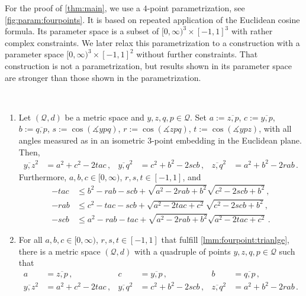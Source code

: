 \documentclass{article}
\newcommand*{\mc}[1]{\mathcal{#1}}
\newcommand{\Rp}{[0, \infty)} %
\newcommand{\equationFullstop}{\, .}
\newcommand{\eqfs}{\equationFullstop}
\newcommand{\equationComma}{\, ,}
\newcommand{\eqcm}{\equationComma}
\newcommand{\ol}[2]{\overline{#1,#2}}
\begin{document}
%
For the proof of \cref{thm:main}, we use a $4$-point parametrization, see \cref{fig:param:fourpoints}. It is based on repeated application of the Euclidean cosine formula. Its parameter space is a subset of $\Rp^3\times[-1,1]^3$ with rather complex constraints. We later relax this parametrization to a construction with a parameter space $\Rp^3\times[-1,1]^2$ without further constraints. That construction is not a parametrization, but results shown in its parameter space are stronger than those shown in the parametrization.
%
\begin{proposition}\label{lmm:fourpoint}\mbox{ }
	\begin{enumerate}[label=(\roman*)]
		\item Let $(\mc Q, d)$ be a metric space and $y,z,q,p\in\mc Q$. Set $a:=\ol zp$, $c:=\ol yp$, $b:=\ol qp$, $s := \cos(\measuredangle ypq)$, $r := \cos(\measuredangle zpq)$, $t := \cos(\measuredangle ypz)$, with all angles measured as in an isometric $3$-point embedding in the Euclidean plane.
		Then,
		\begin{align*}
			\ol yz^2 &= a^2 + c^2 - 2tac\eqcm
			&
			\ol yq^2 &= c^2 + b^2 - 2scb\eqcm
			&
			\ol zq^2 &= a^2 + b^2 - 2rab
			\eqfs
		\end{align*}
		Furthermore, $a,b,c\in\Rp$, $r,s,t\in[-1, 1]$, and
		\begin{equation}\label{lmm:fourpoint:trianlge}
			\begin{aligned}
				-tac &\leq b^2 - rab - scb + \sqrt{a^2 - 2rab + b^2}\sqrt{c^2 - 2scb + b^2}\eqcm\\
				-rab &\leq c^2 - tac - scb + \sqrt{a^2 - 2tac + c^2}\sqrt{c^2 - 2scb + b^2}\eqcm\\
				-scb &\leq a^2 - rab - tac + \sqrt{a^2 - 2rab + b^2}\sqrt{a^2 - 2tac + c^2}\eqfs
			\end{aligned} 
		\end{equation}
		\item For all $a,b,c\in\Rp$, $r,s,t\in[-1, 1]$ that fulfill \eqref{lmm:fourpoint:trianlge}, there is a metric space $(\mc Q, d)$ with a quadruple of points $y,z,q,p\in\mc Q$ such that
		\begin{align*}
			a &= \ol zp\eqcm
			&
			c &= \ol yp\eqcm
			&
			b &= \ol qp\eqcm
			\\
			\ol yz^2 &= a^2 + c^2 - 2tac\eqcm
			&
			\ol yq^2 &= c^2 + b^2 - 2scb\eqcm
			&
			\ol zq^2 &= a^2 + b^2 - 2rab
			\eqfs
		\end{align*}
	\end{enumerate}
\end{proposition}
\end{document}
